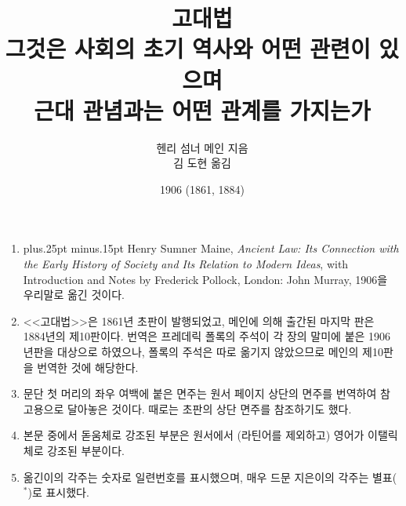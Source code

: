 \documentclass[b5paper]{book}
\def\latinmarks{\hangulpunctuations=0
    \aftergroup\hangulpunctuations\aftergroup1\aftergroup\relax }
\def\latin#1{\ifnum\lastskip=0 \penalty50 \hskip0pt plus.25pt minus.15pt\fi
  \begingroup\latinmarks\footnotesize #1\endgroup}
\def\paren#1{\begingroup\small(#1)\endgroup}
\begin{document}
\title{고대법\\
\large 그것은 사회의 초기 역사와 어떤 관련이 있으며\\
근대 관념과는 어떤 관계를 가지는가}
\author{헨리 섬너 메인 지음\\
김 도현 옮김}
\date{1906 (1861, 1884)}

\frontmatter

\maketitle

\null\vfill
\thispagestyle{empty}
\begin{enumerate}
    \small
  \item \latin{\small
    Henry Sumner Maine, \textit{Ancient Law: Its Connection with
    the Early History of Society and Its Relation to Modern Ideas}, with
    Introduction and Notes by Frederick Pollock, London: John Murray,
    1906}을 우리말로 옮긴 것이다.
  \item <<고대법>>은 1861년 초판이 발행되었고,
    메인에 의해 출간된 마지막 판은 1884년의 제10판이다.
    번역은 프레데릭 폴록의 주석이
    각 장의 말미에 붙은 1906년판을 대상으로 하였으나,
    폴록의 주석은 따로 옮기지 않았으므로
    메인의 제10판을 번역한 것에 해당한다.
  \item 문단 첫 머리의 좌우 여백에 붙은 면주는 원서 페이지 상단의 면주를
    번역하여
    참고용으로
    달아놓은 것이다.
    때로는 초판의 상단 면주를 참조하기도 했다.
  \item 본문 중에서 돋움체로 강조된 부분은
    원서에서 \paren{라틴어를 제외하고} 영어가
    이탤릭체로 강조된 부분이다.
  \item 옮긴이의 각주는 숫자로 일련번호를 표시했으며,
    매우 드문 지은이의 각주는 별표($^*$)로 표시했다.
\end{enumerate}

\tableofcontents

\mainmatter











\end{document}
